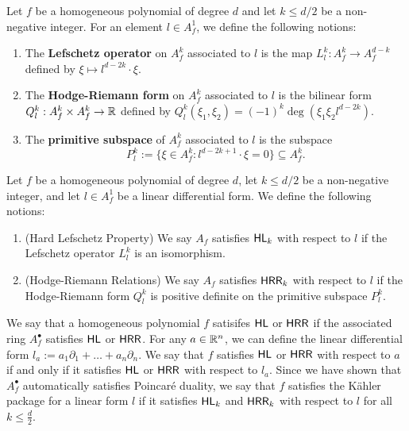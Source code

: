 \documentclass{puthesis-UG}
\begin{document}
\begin{defn}
	Let $f$ be a homogeneous polynomial of degree $d$ and let $k \leq d/2$ be a non-negative integer. For an element $l \in A_f^1$, we define the following notions:
	\begin{enumerate}[label = (\alph*)]
		\item The \textbf{Lefschetz operator} on $A_f^k$ associated to $l$ is the map $L_l^k : A_f^k \to A_f^{d-k}$ defined by $\xi \mapsto l^{d-2k} \cdot \xi$. 

		\item The \textbf{Hodge-Riemann form} on $A_f^k$ associated to $l$ is the bilinear form $Q_l^k : A_f^k \times A_f^k \to \mathbb{R}$ defined by $Q_l^k (\xi_1, \xi_2) = (-1)^k \deg (\xi_1 \xi_2 l^{d-2k})$.

		\item The \textbf{primitive subspace} of $A_f^k$ associated to $l$ is the subspace
		\[
			P_l^k := \{\xi \in A_f^k : l^{d-2k+1} \cdot \xi = 0\} \subseteq A_f^k.
		\]
	\end{enumerate}
\end{defn}

\begin{defn}
	Let $f$ be a homogeneous polynomial of degree $d$, let $k \leq d/2$ be a non-negative integer, and let $l \in A_f^1$ be a linear differential form. We define the following notions:
	\begin{enumerate}[label = (\alph*)]
		\item (Hard Lefschetz Property) We say $A_f$ satisfies $\mathsf{HL}_k$ with respect to $l$ if the Lefschetz operator $L_l^k$ is an isomorphism.

		\item (Hodge-Riemann Relations) We say $A_f$ satisfies $\mathsf{HRR}_k$ with respect to $l$ if the Hodge-Riemann form $Q_l^k$ is positive definite on the primitive subspace $P_l^k$. 
	\end{enumerate}
\end{defn}

We say that a homogeneous polynomial $f$ satisifes $\mathsf{HL}$ or $\mathsf{HRR}$ if the associated ring $A_f^\bullet$ satisfies $\mathsf{HL}$ or $\mathsf{HRR}$. For any $a \in \mathbb{R}^n$, we can define the linear differential form $l_a := a_1 \partial_1 + \ldots + a_n \partial_n$. We say that $f$ satisfies $\mathsf{HL}$ or $\mathsf{HRR}$ with respect to $a$ if and only if it satisfies $\mathsf{HL}$ or $\mathsf{HRR}$ with respect to $l_a$. Since we have shown that $A_f^\bullet$ automatically satisfies Poincar\'e duality, we say that $f$ satisfies the K\"ahler package for a linear form $l$ if it satisfies $\mathsf{HL}_k$ and $\mathsf{HRR}_k$ with respect to $l$ for all $k \leq \frac{d}{2}$. 
\end{document}
